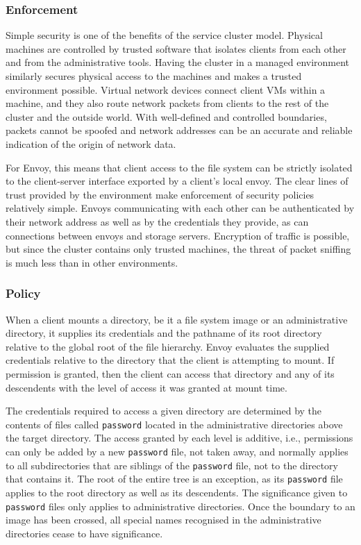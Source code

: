 \subsubsection{Enforcement}

Simple security is one of the benefits of the service cluster model. Physical machines are controlled by trusted software that isolates clients from each other and from the administrative tools. Having the cluster in a managed environment similarly secures physical access to the machines and makes a trusted environment possible. Virtual network devices connect client VMs within a machine, and they also route network packets from clients to the rest of the cluster and the outside world. With well-defined and controlled boundaries, packets cannot be spoofed and network addresses can be an accurate and reliable indication of the origin of network data.

For Envoy, this means that client access to the file system can be strictly isolated to the client-server interface exported by a client's local envoy. The clear lines of trust provided by the environment make enforcement of security policies relatively simple. Envoys communicating with each other can be authenticated by their network address as well as by the credentials they provide, as can connections between envoys and storage servers. Encryption of traffic is possible, but since the cluster contains only trusted machines, the threat of packet sniffing is much less than in other environments.

\subsubsection{Policy}

When a client mounts a directory, be it a file system image or an administrative directory, it supplies its credentials and the pathname of its root directory relative to the global root of the file hierarchy. Envoy evaluates the supplied credentials relative to the directory that the client is attempting to mount. If permission is granted, then the client can access that directory and any of its descendents with the level of access it was granted at mount time.

The credentials required to access a given directory are determined by the contents of files called \texttt{password} located in the administrative directories above the target directory. The access granted by each level is additive, i.e., permissions can only be added by a new \texttt{password} file, not taken away, and normally applies to all subdirectories that are siblings of the \texttt{password} file, not to the directory that contains it. The root of the entire tree is an exception, as its \texttt{password} file applies to the root directory as well as its descendents. The significance given to \texttt{password} files only applies to administrative directories. Once the boundary to an image has been crossed, all special names recognised in the administrative directories cease to have significance.

